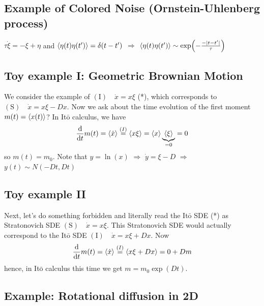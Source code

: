 \documentclass{notebook}
\begin{document}
\subsection*{Example of Colored Noise (Ornstein-Uhlenberg process)}

$\tau \dot{\xi} = - \xi + \eta$ and $\expval{\eta(t) \eta(t')} = \delta(t-t')$ $\Rightarrow$ $\expval{\eta(t) \eta(t')} \sim \exp(- \frac{-|t-t'|}{\tau})$

\subsection*{Toy example I: Geometric Brownian Motion}

We consider the example of $\mathrm{(I)} \quad \dot{x} = x \xi$ (*), which corresponds to $\mathrm{(S)} \quad \dot{x} = x \xi - Dx$. Now we ask about the time evolution of the first moment $m(t) = \expval{x(t)}$? In It$\bar{\mathrm{o}}$ calculus, we have
%
\begin{equation}
	\dv{t} m(t) = \expval{\dot{x}} \overset{(I)}{=} \expval{x \xi} = \expval{x} \underbrace{\expval{\xi}}_{= 0} = 0
\end{equation}
%
so $m(t) = m_0$. Note that $y = \ln(x)$ $\Rightarrow$ $\dot{y} = \xi - D$ $\Rightarrow$ $y(t) \sim N(-D t, D t)$

\subsection*{Toy example II}

Next, let's do something forbidden and literally read the It$\bar{\mathrm{o}}$ SDE (*) as Stratonovich SDE $\mathrm{(S)} \quad \dot{x} = x \xi$. This Stratonovich SDE would actually correspond to the It$\bar{\mathrm{o}}$ SDE $\mathrm{(I)} \quad \dot{x} = x \xi + D x$. Now
%
\begin{equation}
\dv{t} m(t) = \expval{\dot{x}} \overset{(I)}{=} \expval{x \xi + D x} = 0 + D m
\end{equation}
%
hence, in It$\bar{\mathrm{o}}$ calculus this time we get $m = m_0 \exp(Dt)$.

\subsection*{Example: Rotational diffusion in 2D}
\end{document}

